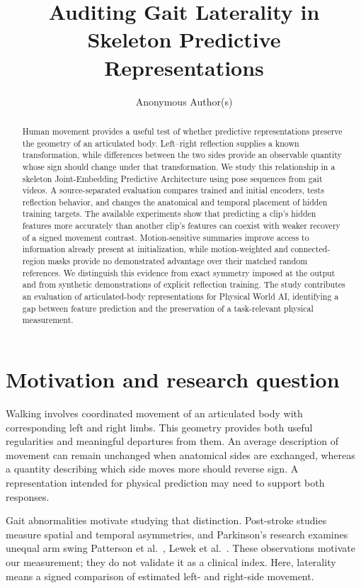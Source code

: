 \documentclass{article}
\title{Auditing Gait Laterality in Skeleton Predictive Representations}
\author{Anonymous Author(s)}
\begin{document}
\maketitle
\begin{abstract}
Human movement provides a useful test of whether predictive representations preserve the geometry of an articulated body. Left--right reflection supplies a known transformation, while differences between the two sides provide an observable quantity whose sign should change under that transformation. We study this relationship in a skeleton Joint-Embedding Predictive Architecture using pose sequences from gait videos. A source-separated evaluation compares trained and initial encoders, tests reflection behavior, and changes the anatomical and temporal placement of hidden training targets. The available experiments show that predicting a clip's hidden features more accurately than another clip's features can coexist with weaker recovery of a signed movement contrast. Motion-sensitive summaries improve access to information already present at initialization, while motion-weighted and connected-region masks provide no demonstrated advantage over their matched random references. We distinguish this evidence from exact symmetry imposed at the output and from synthetic demonstrations of explicit reflection training. The study contributes an evaluation of articulated-body representations for Physical World AI, identifying a gap between feature prediction and the preservation of a task-relevant physical measurement.
\end{abstract}
\section{Motivation and research question}\label{motivation-and-research-question}

Walking involves coordinated movement of an articulated body with corresponding left and right limbs. This geometry provides both useful regularities and meaningful departures from them. An average description of movement can remain unchanged when anatomical sides are exchanged, whereas a quantity describing which side moves more should reverse sign. A representation intended for physical prediction may need to support both responses.

Gait abnormalities motivate studying that distinction. Post-stroke studies measure spatial and temporal asymmetries, and Parkinson's research examines unequal arm swing Patterson et al.~\citep{ref01}, Lewek et al.~\citep{ref02}. These observations motivate our measurement; they do not validate it as a clinical index. Here, laterality means a signed comparison of estimated left- and right-side movement.
\end{document}
